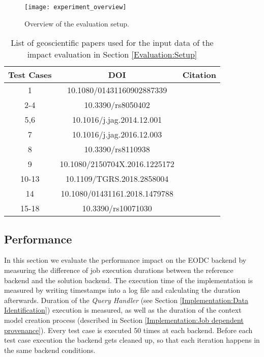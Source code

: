 \documentclass[draft,final]{vutinfth} %
\begin{document}
\begin{figure}[h]
	\centering
	\texttt{[image: experiment\_overview]}
	\caption{Overview of the evaluation setup.}
	\label{fig:experiment_overview} %
\end{figure}

\begin{table}[]
	\caption{List of geoscientific papers used for the input data of the impact evaluation in Section \ref{Evaluation:Setup}}
	\centering
	\begin{tabular}{c|c|c}
		\textbf{Test Cases} & \textbf{DOI} & \textbf{Citation}  \\ \hline
		1 & 10.1080/01431160902887339 & \cite{evaluation1} \\ 
		2-4 & 10.3390/rs8050402 & \cite{evaluation2} \\ 
		5,6 & 10.1016/j.jag.2014.12.001  & \cite{evaluation3} \\
		7 & 10.1016/j.jag.2016.12.003  & \cite{evaluation4} \\
		8 & 10.3390/rs8110938  & \cite{evaluation5} \\
		9 & 10.1080/2150704X.2016.1225172  & \cite{evaluation6} \\
		10-13 & 10.1109/TGRS.2018.2858004  & \cite{evaluation7} \\
		14 & 10.1080/01431161.2018.1479788  & \cite{evaluation8} \\
		15-18 & 10.3390/rs10071030  & \cite{evaluation9} \\
	\end{tabular}
	\label{Tab:appendix}
\end{table}

\subsection{Performance}\label{Evaluation:impact_perf}

In this section we evaluate the performance impact on the EODC backend by measuring the difference of job execution durations between the reference backend and the solution backend. The execution time of the implementation is measured by writing timestamps into a log file and calculating the duration afterwards. Duration of the \textit{Query Handler} (see Section \ref{Implementation:Data Identification}) execution is measured, as well as the duration of the context model creation process (described in Section \ref{Implementation:Job dependent provenance}). Every test case is executed 50 times at each backend. Before each test case execution the backend gets cleaned up, so that each iteration happens in the same backend conditions.  
\end{document}
